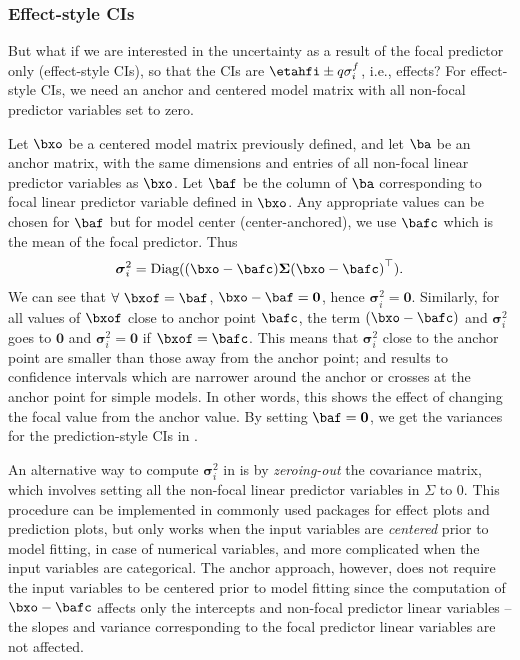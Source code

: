 \subsubsection{Effect-style CIs}

But what if we are interested in the uncertainty as a result of the focal predictor only (effect-style CIs), so that the CIs are $\etahfi \pm q\sigma^f_i$, i.e., effects? For effect-style CIs, we need an anchor and centered model matrix with all non-focal predictor variables set to zero. 

Let $\bxo$ be a centered model matrix previously defined, and let $\ba$ be an anchor matrix, with the same dimensions and entries of all non-focal linear predictor variables as $\bxo$. Let $\baf$ be the column of $\ba$ corresponding to focal linear predictor variable defined in $\bxo$. Any appropriate values can be chosen for $\baf$ but for model center (center-anchored), we use $\bafc$ which is the mean of the focal predictor. Thus 
%
\begin{align}\label{eq:centered_variance}
\boldsymbol\sigma^2_i = \textrm{Diag}((\bxo - \bafc) \boldsymbol{\Sigma} {(\bxo - \bafc)}^\top).
\end{align}
%
We can see that $\forall ~\bxof=\baf$, $\bxo - \baf = \boldsymbol 0$, hence $\boldsymbol\sigma_i^2 = \boldsymbol{0}$. Similarly, for all values of $\bxof$ close to anchor point $\bafc$, the term $(\bxo - \bafc)$ and $\boldsymbol\sigma_i^2$ goes to $\boldsymbol 0$ and $\boldsymbol\sigma_i^2 = \boldsymbol 0$ if $\bxof=\bafc$. This means that $\boldsymbol\sigma_i^2$ close to the anchor point are smaller than those away from the anchor point; and results to confidence intervals which are narrower around the anchor or crosses at the anchor point for simple models. In other words, this shows the effect of changing the focal value from the anchor value. By setting $\baf = \boldsymbol 0$, we get the variances for the prediction-style CIs in .

An alternative way to compute $\boldsymbol\sigma^2_i$ in  is
by \emph{zeroing-out} the covariance matrix, which involves setting all the non-focal
linear predictor variables in $\Sigma$ to $0$. This procedure can be implemented 
in commonly used  packages for effect plots and prediction plots, but only
works when the input variables are \emph{centered} prior to model fitting, in case of
numerical variables, and more complicated when the input variables are categorical. 
The anchor approach, however, does not require the input variables to be centered
prior to model fitting since the computation of $\bxo - \bafc$ affects only the 
intercepts and non-focal predictor linear variables -- the slopes and variance
corresponding to the focal predictor linear variables are not affected. 

